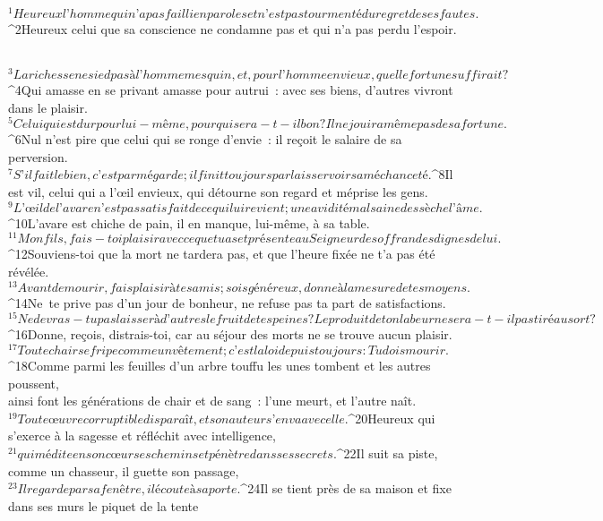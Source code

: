          
      \bchapter{}
${}^{1}Heureux l’homme qui n’a pas failli en paroles
        et n’est pas tourmenté du regret de ses fautes.
${}^{2}Heureux celui que sa conscience ne condamne pas
        et qui n’a pas perdu l’espoir.
        
           
${}^{3}La richesse ne sied pas à l’homme mesquin,
        et, pour l’homme envieux, quelle fortune suffirait ?
${}^{4}Qui amasse en se privant amasse pour autrui :
        avec ses biens, d’autres vivront dans le plaisir.
${}^{5}Celui qui est dur pour lui-même, pour qui sera-t-il bon ?
        Il ne jouira même pas de sa fortune.
${}^{6}Nul n’est pire que celui qui se ronge d’envie :
        il reçoit le salaire de sa perversion.
${}^{7}S’il fait le bien, c’est par mégarde ;
        il finit toujours par laisser voir sa méchanceté.
${}^{8}Il est vil, celui qui a l’œil envieux,
        qui détourne son regard et méprise les gens.
${}^{9}L’œil de l’avare n’est pas satisfait de ce qui lui revient ;
        une avidité malsaine dessèche l’âme.
${}^{10}L’avare est chiche de pain,
        il en manque, lui-même, à sa table.
         
${}^{11}Mon fils, fais-toi plaisir avec ce que tu as
        et présente au Seigneur des offrandes dignes de lui.
${}^{12}Souviens-toi que la mort ne tardera pas,
        et que l’heure fixée ne t’a pas été révélée.
${}^{13}Avant de mourir, fais plaisir à tes amis ;
        sois généreux, donne à la mesure de tes moyens.
${}^{14}Ne te prive pas d’un jour de bonheur,
        ne refuse pas ta part de satisfactions.
${}^{15}Ne devras-tu pas laisser à d’autres le fruit de tes peines ?
        Le produit de ton labeur ne sera-t-il pas tiré au sort ?
${}^{16}Donne, reçois, distrais-toi,
        car au séjour des morts ne se trouve aucun plaisir.
${}^{17}Toute chair se fripe comme un vêtement ;
        c’est la loi depuis toujours : Tu dois mourir.
${}^{18}Comme parmi les feuilles d’un arbre touffu
        les unes tombent et les autres poussent,
        \\ainsi font les générations de chair et de sang :
        l’une meurt, et l’autre naît.
${}^{19}Toute œuvre corruptible disparaît,
        et son auteur s’en va avec elle.
        ${}^{20}Heureux qui s’exerce à la sagesse
        et réfléchit avec intelligence,
        ${}^{21}qui médite en son cœur ses chemins
        et pénètre dans ses secrets.
        ${}^{22}Il suit sa piste, comme un chasseur,
        il guette son passage,
        ${}^{23}Il regarde par sa fenêtre,
        il écoute à sa porte.
        ${}^{24}Il se tient près de sa maison
        et fixe dans ses murs le piquet de la tente
